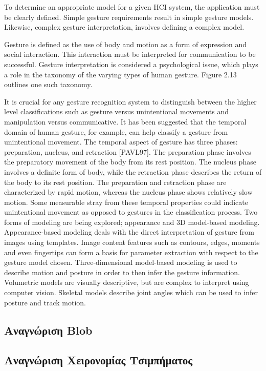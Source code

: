To determine an appropriate model for a given HCI system, the application must be clearly defined. Simple gesture requirements result in simple gesture models. Likewise, complex gesture interpretation, involves defining a complex model.

Gesture is defined as the use of body and motion as a form of expression and social interaction. This interaction must be interpreted for communication to be successful. Gesture interpretation is considered a psychological issue, which plays a role in the taxonomy of the varying types of human gesture. Figure 2.13 outlines one such taxonomy.

It is crucial for any gesture recognition system to distinguish between the higher level classifications such as gesture versus unintentional movements and manipulation versus communicative. It has been suggested that the temporal domain of human gesture, for example, can help classify a gesture from unintentional movement. The temporal aspect of gesture has three phases: preparation, nucleus, and retraction [PAVL97]. The preparation phase involves the preparatory movement of the body from its rest position. The nucleus phase involves a definite form of body, while the retraction phase describes the return of the body to its rest position. The preparation and retraction phase are characterized by rapid motion, whereas the nucleus phase shows relatively slow motion. Some measurable stray from these temporal properties could indicate unintentional movement as opposed to gestures in the classification process. Two forms of modeling are being explored; appearance and 3D model-based modeling. Appearance-based modeling deals with the direct interpretation of gesture from images using templates. Image content features such as contours, edges, moments and even fingertips can form a basis for parameter extraction with respect to the gesture model chosen. Three-dimensional model-based modeling is used to describe motion and posture in order to then infer the gesture information. Volumetric models are visually descriptive, but are complex to interpret using computer vision. Skeletal models describe joint angles which can be used to infer posture and track motion.


\subsection{Αναγνώριση Blob}


\subsection{Αναγνώριση Χειρονομίας Τσιμπήματος}

